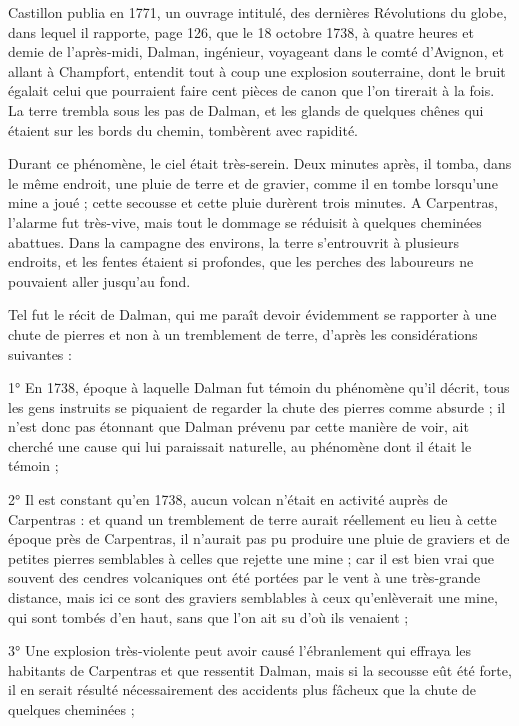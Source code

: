 \documentclass[a4paper, 12pt, oneside, french]{article}
\begin{document}
Castillon publia en 1771, un ouvrage intitulé, des dernières Révolutions du globe, dans lequel il rapporte, page 126, que le 18 octobre 1738, à quatre heures et demie de l'après-midi, Dalman, ingénieur, voyageant dans le comté d'Avignon, et allant à Champfort, entendit tout à coup une explosion souterraine, dont le bruit égalait celui que pourraient faire cent pièces de canon que l'on tirerait à la fois. La terre trembla sous les pas de Dalman, et les glands de quelques chênes qui étaient sur les bords du chemin, tombèrent avec rapidité.

Durant ce phénomène, le ciel était très-serein. Deux minutes après, il tomba, dans le même endroit, une pluie de terre et de gravier, comme il en tombe lorsqu'une mine a joué ; cette secousse et cette pluie durèrent trois minutes. A Carpentras, l'alarme fut très-vive, mais tout le dommage se réduisit à quelques cheminées abattues. Dans la campagne des environs, la terre s'entrouvrit à plusieurs endroits, et les fentes étaient si profondes, que les perches des laboureurs ne pouvaient aller jusqu'au fond.

Tel fut le récit de Dalman, qui me paraît devoir évidemment se rapporter à une chute de pierres et non à un tremblement de terre, d'après les considérations suivantes :

1° En 1738, époque à laquelle Dalman fut témoin du phénomène qu'il décrit, tous les gens instruits se piquaient de regarder la chute des pierres comme absurde ; il n'est donc pas étonnant que Dalman prévenu par cette manière de voir, ait cherché une cause qui lui paraissait naturelle, au phénomène dont il était le témoin ;

2° Il est constant qu'en 1738, aucun volcan n'était en activité auprès de Carpentras : et quand un tremblement de terre aurait réellement eu lieu à cette époque près de Carpentras, il n'aurait pas pu produire une pluie de graviers et de petites pierres semblables à celles que rejette une mine ; car il est bien vrai que souvent des cendres volcaniques ont été portées par le vent à une très-grande distance, mais ici ce sont des graviers semblables à ceux qu'enlèverait une mine, qui sont tombés d'en haut, sans que l'on ait su d'où ils venaient ;

3° Une explosion très-violente peut avoir causé l'ébranlement qui effraya les habitants de Carpentras et que ressentit Dalman, mais si la secousse eût été forte, il en serait résulté nécessairement des accidents plus fâcheux que la chute de quelques cheminées ;
\end{document}

